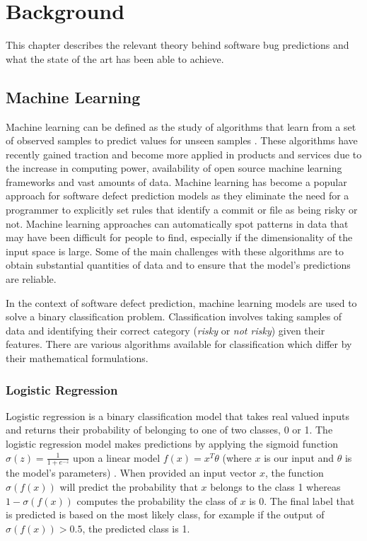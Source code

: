 \documentclass[../main.tex]{subfiles}
\begin{document}
\chapter{Background} \label{chapter:background}

This chapter describes the relevant theory behind software bug predictions and what the state of the art has been able to achieve. 

\section{Machine Learning} 

Machine learning can be defined as the study of algorithms that learn from a set of observed samples to predict values for unseen samples \cite{koza1996automated}. These algorithms have recently gained traction and become more applied in products and services due to the increase in computing power, availability of open source machine learning frameworks and vast amounts of data. Machine learning has become a popular approach for software defect prediction models as they eliminate the need for a programmer to explicitly set rules that identify a commit or file as being risky or not. Machine learning approaches can automatically spot patterns in data that may have been difficult for people to find, especially if the dimensionality of the input space is large. Some of the main challenges with these algorithms are to obtain substantial quantities of data and to ensure that the model's predictions are reliable.

In the context of software defect prediction, machine learning models are used to solve a binary classification problem. Classification involves taking samples of data and identifying their correct category (\textit{risky} or \textit{not risky}) given their features. There are various algorithms available for classification which differ by their mathematical formulations.

\subsection{Logistic Regression}

Logistic regression is a binary classification model that takes real valued inputs and returns their probability of belonging to one of two classes, 0 or 1. The logistic regression model makes predictions by applying the sigmoid function $\sigma(z) = \frac{1}{1+e^{-z}}$ upon a linear model $f(x) = x^T\theta$ (where $x$ is our input and $\theta$ is the model's parameters) \cite{bishop2006pattern}. When provided an input vector $x$, the function $\sigma(f(x))$ will predict the probability that $x$ belongs to the class 1 whereas $1-\sigma(f(x))$ computes the probability the class of $x$ is 0. The final label that is predicted is based on the most likely class, for example if the output of $\sigma(f(x)) > 0.5$, the predicted class is 1.  
\end{document}
